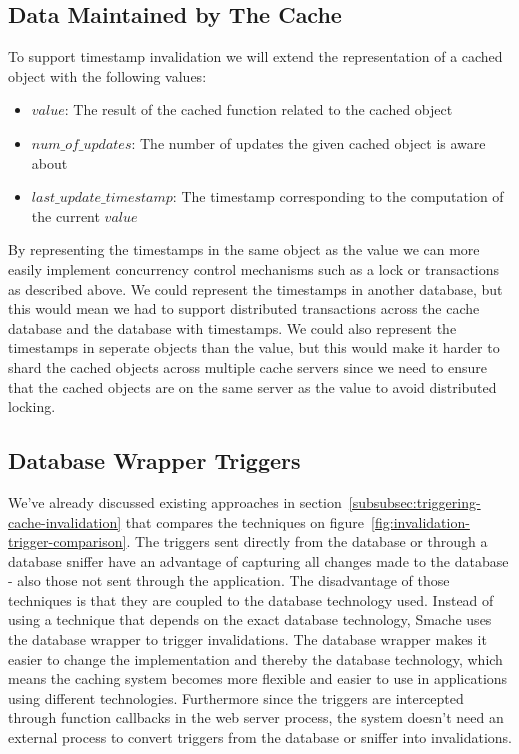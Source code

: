 

\subsection{Data Maintained by The Cache}
\label{subsec:data-maintained-by-the-cache}

To support timestamp invalidation we will extend the representation of a cached object with the following values:

\begin{itemize}
  \item $value$: The result of the cached function related to the cached object
  \item $num\_of\_updates$: The number of updates the given cached object is aware about
  \item $last\_update\_timestamp$: The timestamp corresponding to the computation of the current $value$
\end{itemize}

By representing the timestamps in the same object as the value we can more easily implement concurrency control mechanisms such as a lock or transactions as described above. We could represent the timestamps in another database, but this would mean we had to support distributed transactions across the cache database and the database with timestamps. We could also represent the timestamps in seperate objects than the value, but this would make it harder to shard the cached objects across multiple cache servers since we need to ensure that the cached objects are on the same server as the value to avoid distributed locking.


\subsection{Database Wrapper Triggers}
\label{subsec:database-wrapper-triggers}


We've already discussed existing approaches in section~\ref{subsubsec:triggering-cache-invalidation} that compares the techniques on figure~\ref{fig:invalidation-trigger-comparison}. The triggers sent directly from the database or through a database sniffer have an advantage of capturing all changes made to the database - also those not sent through the application. The disadvantage of those techniques is that they are coupled to the database technology used. Instead of using a technique that depends on the exact database technology, Smache uses the database wrapper to trigger invalidations. The database wrapper makes it easier to change the implementation and thereby the database technology, which means the caching system becomes more flexible and easier to use in applications using different technologies. Furthermore since the triggers are intercepted through function callbacks in the web server process, the system doesn't need an external process to convert triggers from the database or sniffer into invalidations.


